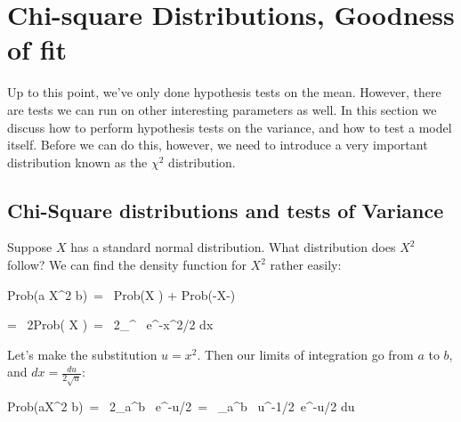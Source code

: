 
\section{Chi-square Distributions, Goodness of fit} \label{sec:ChiSquare}



Up to this point, we've only done hypothesis tests on the mean.  However, there are tests we can run on other interesting parameters as well.  In this section we discuss how to perform hypothesis tests on the variance, and how to test a model itself.  Before we can do this, however, we need to introduce a very important distribution known as the $\chi^2$ distribution.







\subsection{Chi-Square distributions and tests of Variance}



Suppose $X$ has a standard normal distribution.  What distribution does $X^2$ follow?  We can find the density function for $X^2$ rather easily:



\bel

\textrm{Prob}(a \leq X^2 \leq b)\ = \ \textrm{Prob}(\leq X \leq {}) + \textrm{Prob}(-\leq X\leq -)

\eel

\bel = \ 2\cdot\textrm{Prob}( \leq X \leq {})\ = \ 2\int_{}^{} \ e^{-x^2/2} dx

\eel

Let's make the substitution $u = x^2$.  Then our limits of integration go from $a$ to $b$, and $dx = \frac{du}{2\sqrt{u}}$:



\bel

\textrm{Prob}(a\leq X^2 \leq b)\ = \ 2\int_{a}^{b} \ e^{-u/2}\ = \ \int_{a}^{b} \ u^{-1/2}\ e^{-u/2} du

